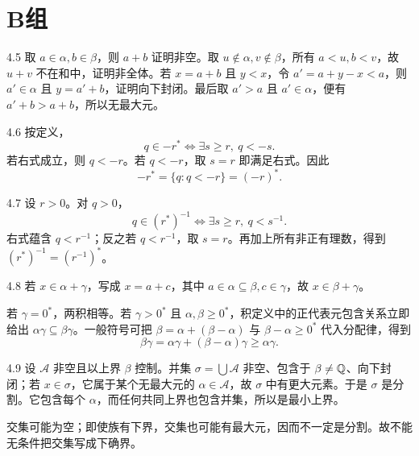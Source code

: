 \section*{B组}

\begin{solution}{4.5}
取 \(a\in\alpha,b\in\beta\)，则 \(a+b\) 证明非空。取 \(u\notin\alpha,v\notin\beta\)，所有 \(a<u,b<v\)，故 \(u+v\) 不在和中，证明非全体。若 \(x=a+b\) 且 \(y<x\)，令 \(a'=a+y-x<a\)，则 \(a'\in\alpha\) 且 \(y=a'+b\)，证明向下封闭。最后取 \(a'>a\) 且 \(a'\in\alpha\)，便有 \(a'+b>a+b\)，所以无最大元。
\end{solution}

\begin{solution}{4.6}
按定义，
\[
 q\in-r^*
 \Longleftrightarrow \exists s\ge r,\ q<-s.
\]
若右式成立，则 \(q<-r\)。若 \(q<-r\)，取 \(s=r\) 即满足右式。因此
\[
 -r^*=\{q:q<-r\}=(-r)^*.
\]
\end{solution}

\begin{solution}{4.7}
设 \(r>0\)。对 \(q>0\)，
\[
 q\in(r^*)^{-1}
 \Longleftrightarrow \exists s\ge r,\ q<s^{-1}.
\]
右式蕴含 \(q<r^{-1}\)；反之若 \(q<r^{-1}\)，取 \(s=r\)。再加上所有非正有理数，得到 \((r^*)^{-1}=(r^{-1})^*\)。
\end{solution}

\begin{solution}{4.8}
若 \(x\in\alpha+\gamma\)，写成 \(x=a+c\)，其中 \(a\in\alpha\subseteq\beta,c\in\gamma\)，故 \(x\in\beta+\gamma\)。

若 \(\gamma=0^*\)，两积相等。若 \(\gamma>0^*\) 且 \(\alpha,\beta\ge0^*\)，积定义中的正代表元包含关系立即给出 \(\alpha\gamma\subseteq\beta\gamma\)。一般符号可把 \(\beta=\alpha+(\beta-\alpha)\) 与 \(\beta-\alpha\ge0^*\) 代入分配律，得到
\[
 \beta\gamma=\alpha\gamma+(\beta-\alpha)\gamma\ge\alpha\gamma.
\]
\end{solution}

\begin{solution}{4.9}
设 \(\mathcal A\) 非空且以上界 \(\beta\) 控制。并集 \(\sigma=\bigcup\mathcal A\) 非空、包含于 \(\beta\ne\mathbb{Q}\)、向下封闭；若 \(x\in\sigma\)，它属于某个无最大元的 \(\alpha\in\mathcal A\)，故 \(\sigma\) 中有更大元素。于是 \(\sigma\) 是分割。它包含每个 \(\alpha\)，而任何共同上界也包含并集，所以是最小上界。

交集可能为空；即使族有下界，交集也可能有最大元，因而不一定是分割。故不能无条件把交集写成下确界。
\end{solution}

